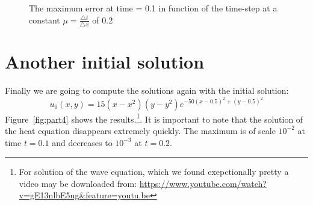 \begin{figure}[htbp] %
   \centering
    
   \caption{The maximum error at time = 0.1 in function of the time-step at a constant $\mu = \frac{\triangle t}{\triangle x}$ of 0.2}
   \label{errororrrTransport}
\end{figure}




\section{Another initial solution}
Finally we are going to compute the solutions again with the initial solution:
\begin{equation}
u_0(x,y) = 15(x-x^2)(y - y^2) e^{-50(x-0.5)^2 + (y-0.5)^2}
\end{equation}
Figure~\ref*{fig:part4} shows the results.\footnote{For solution of the wave equation, which we found exepctionally pretty a video may be downloaded from: \url{https://www.youtube.com/watch?v=gE13nlbE5ug&feature=youtu.be}}. It is important to note that the solution of the heat equation disappears extremely quickly. The maximum is of scale $10^{-2}$ at time $t = 0.1$ and decreases to $10^{-3}$ at $t=0.2$.

